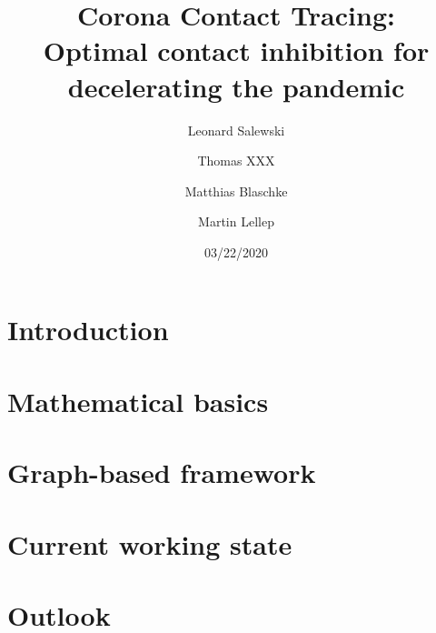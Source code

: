 \documentclass[%
 reprint,
 amsmath,amssymb,showkeys,
 aps,
]{revtex4-1}
\begin{document}
\title{Corona Contact Tracing:\\Optimal contact inhibition for decelerating the pandemic}

\author{Leonard Salewski}
\author{Thomas XXX}
\author{Matthias Blaschke}
\author{Martin Lellep}

\date{03/22/2020}




\maketitle

\section{\label{sec:introcution}Introduction}



\section{\label{sec:basics}Mathematical basics}



\section{\label{sec:framework}Graph-based framework}



\section{\label{sec:working_state}Current working state}



\section{\label{sec:outlook}Outlook}





\end{document}
